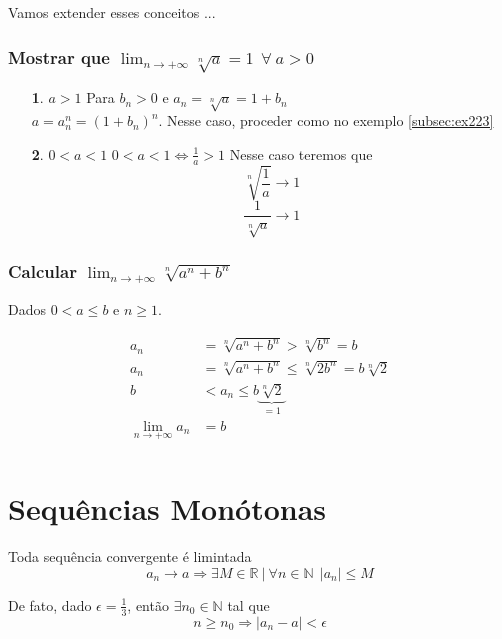 \documentclass[12pt,openany, letterpaper]{book}
\begin{document}
\vspace{10mm}
Vamos extender esses conceitos ...

\subsubsection {Mostrar que $\displaystyle{\lim_{n \rightarrow +\infty} \sqrt[n]{a}} = 1 \ \ \forall \ a > 0$}
\label{sssec:ss2232}
\begin{itemize}
\item [\textbf{1}. $ a > 1 $] Para $b_n > 0$ e $a_n = \sqrt[n]{a} = 1 + b_n$ \\ $a = a_n^n = (1 + b_n)^n$. Nesse caso, proceder como no exemplo \ref{subsec:ex223} 
\item [\textbf{2}. $ 0 < a < 1 $] $ 0 < a < 1 \Longleftrightarrow \frac{1}{a} > 1$ Nesse caso teremos que $$ \sqrt[n]{\frac{1}{a}} \rightarrow 1 $$ $$\frac{1}{\sqrt[n]{a}}\rightarrow 1 $$
\end{itemize}

\subsubsection {Calcular $\displaystyle{\lim_{n \rightarrow +\infty} \sqrt[n]{a^n + b^n}}$}
\label{sssec:ss2233}
\hspace{5mm} Dados $0 < a \leq b$ e $n \geq 1$.

\begin{align*}
a_n &= \sqrt[n]{a^n+b^n} > \sqrt[n]{b^n} = b \\
a_n &= \sqrt[n]{a^n+b^n} \leq \sqrt[n]{2b^n} = b\sqrt[n]{2}\\
b &< a_n \leq b\underbrace{\sqrt[n]{2}}_{= 1}\\
\lim_{n \rightarrow + \infty} a_n &= b \\
\end{align*}

\section{Sequências Monótonas}
\label{sec:s23}

\hspace{5mm}Toda sequência convergente é limintada $$a_n \rightarrow a \Rightarrow \exists M \in \mathds{R} \ | \ \forall n \in \mathds{N} \ \ |a_n| \leq M$$ 

De fato, dado $\epsilon = \frac{1}{3}$, então $\exists n_0 \in \mathds{N}$ tal que $$ n \geq n_0 \Rightarrow |a_n - a| < \epsilon$$
\end{document}
